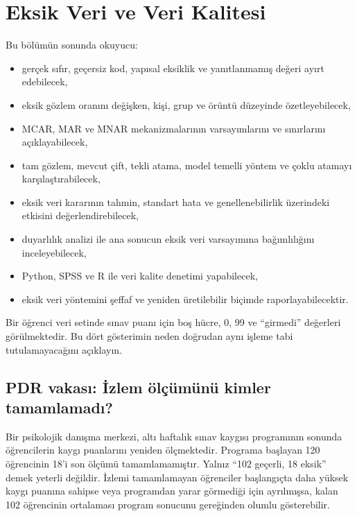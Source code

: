 \chapter{Eksik Veri ve Veri Kalitesi}
\label{ch:missing-data-quality}

\begin{hedefler}
Bu bölümün sonunda okuyucu:
\begin{itemize}
  \item gerçek sıfır, geçersiz kod, yapısal eksiklik ve yanıtlanmamış değeri ayırt edebilecek,
  \item eksik gözlem oranını değişken, kişi, grup ve örüntü düzeyinde özetleyebilecek,
  \item MCAR, MAR ve MNAR mekanizmalarının varsayımlarını ve sınırlarını açıklayabilecek,
  \item tam gözlem, mevcut çift, tekli atama, model temelli yöntem ve çoklu atamayı karşılaştırabilecek,
  \item eksik veri kararının tahmin, standart hata ve genellenebilirlik üzerindeki etkisini değerlendirebilecek,
  \item duyarlılık analizi ile ana sonucun eksik veri varsayımına bağımlılığını inceleyebilecek,
  \item Python, SPSS ve R ile veri kalite denetimi yapabilecek,
  \item eksik veri yöntemini şeffaf ve yeniden üretilebilir biçimde raporlayabilecektir.
\end{itemize}
\end{hedefler}

\begin{hazirlik}
Bir öğrenci veri setinde sınav puanı için boş hücre, 0, 99 ve ``girmedi''
değerleri görülmektedir. Bu dört gösterimin neden doğrudan aynı işleme tabi
tutulamayacağını açıklayın.
\end{hazirlik}

\section{PDR vakası: İzlem ölçümünü kimler tamamlamadı?}

Bir psikolojik danışma merkezi, altı haftalık sınav kaygısı programının
sonunda öğrencilerin kaygı puanlarını yeniden ölçmektedir. Programa başlayan
120 öğrencinin 18'i son ölçümü tamamlamamıştır. Yalnız ``102 geçerli, 18 eksik''
demek yeterli değildir. İzlemi tamamlamayan öğrenciler başlangıçta daha yüksek
kaygı puanına sahipse veya programdan yarar görmediği için ayrılmışsa, kalan
102 öğrencinin ortalaması program sonucunu gereğinden olumlu gösterebilir.

